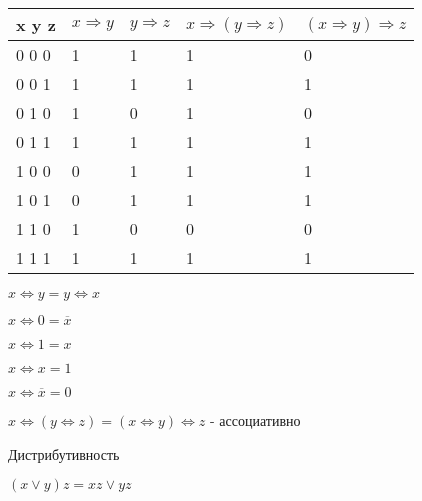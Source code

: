 \documentclass[russian]{lecture-notes}
\begin{document}
\begin{sloppypar}
\begin{proposition}
\begin{table}[h!]
\centering
\begin{tabular}{|l|l|l|l|l|}
\hline
x y z  & $x \Rightarrow y$ & $y \Rightarrow z$ & $x \Rightarrow (y \Rightarrow z)$ & $(x \Rightarrow y) \Rightarrow z$ \\ \hline
0 0  0 & 1               & 1                 & 1                                 & 0                                 \\ \hline
0 0 1  & 1               & 1                 & 1                                 & 1                                 \\ \hline
0 1 0  & 1               & 0                 & 1                                 & 0                                 \\ \hline
0 1 1  & 1               & 1                 & 1                                 & 1                                 \\ \hline
1 0 0  & 0               & 1                 & 1                                 & 1                                 \\ \hline
1 0 1  & 0               & 1                 & 1                                 & 1                                 \\ \hline
1 1 0  & 1               & 0                 & 0                                 & 0                                 \\ \hline
1 1 1  & 1               & 1                 & 1                                 & 1                                 \\ \hline
\end{tabular}
\end{table}

$x \Leftrightarrow y = y \Leftrightarrow x$

$x \Leftrightarrow 0 = \overline{x}$

$x \Leftrightarrow 1 = x$

$x \Leftrightarrow x =1$

$x \Leftrightarrow \overline{x} = 0$

$x \Leftrightarrow (y\Leftrightarrow z) = (x \Leftrightarrow y) \Leftrightarrow z$ - ассоциативно

\end{proposition}

\begin{proposition}

Дистрибутивность

$(x \lor y) z = xz \lor yz$


\end{proposition}
\end{sloppypar}
\end{document}
